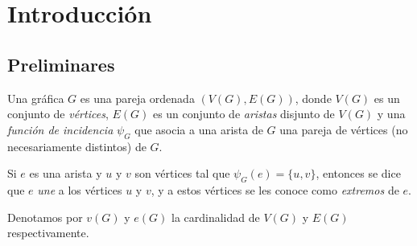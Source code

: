 \chapter{Introducción}

\section{Preliminares}
\begin{definition}
  Una gráfica $G$ es una pareja ordenada $(V(G), E(G))$, donde $V(G)$
  es un conjunto de \textit{vértices},  $E(G)$ es un conjunto de
  \textit{aristas} disjunto de $V(G)$ y una \textit{función de
  incidencia} $\psi_G$ que asocia a una arista de $G$ una pareja
  de vértices (no necesariamente distintos) de $G$.

  Si $e$ es una arista y $u$ y $v$ son vértices tal que $\psi_G(e)
  = \{u, v\}$, entonces se dice que $e$ \textit{une} a los vértices
  $u$ y $v$, y a estos vértices se les conoce como \textit{extremos} de $e$.

  Denotamos por $v(G)$ y $e(G)$ la cardinalidad de $V(G)$ y $E(G)$
  respectivamente.
\end{definition}
